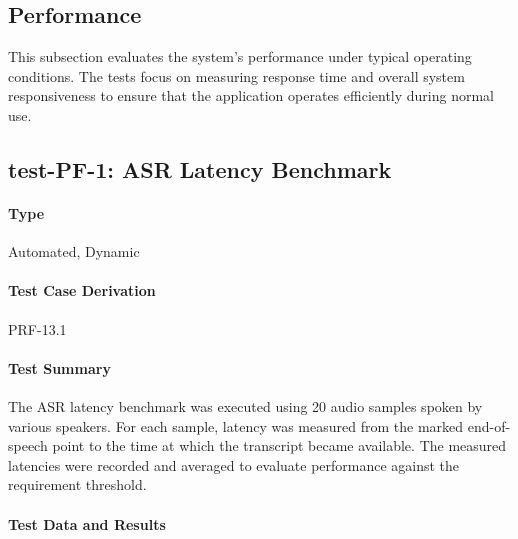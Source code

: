 \documentclass[12pt, titlepage]{article}
\begin{document}
\subsection{Performance}
This subsection evaluates the system’s performance under typical operating conditions. The tests focus on measuring response time and overall system responsiveness to ensure that the application operates efficiently during normal use.
\subsection{test-PF-1: ASR Latency Benchmark}

\paragraph{Type}
Automated, Dynamic

\paragraph{Test Case Derivation}
PRF-13.1

\paragraph{Test Summary}
The ASR latency benchmark was executed using 20 audio samples spoken by various speakers. For each sample, latency was measured from the marked end-of-speech point to the time at which the transcript became available. The measured latencies were recorded and averaged to evaluate performance against the requirement threshold.

\paragraph{Test Data and Results}
\end{document}
